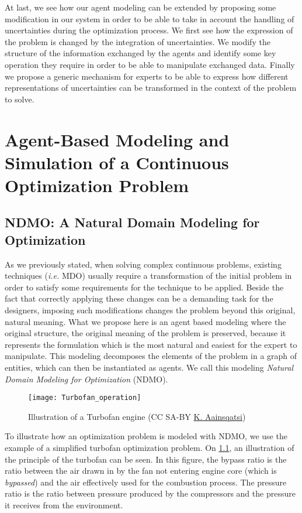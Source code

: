 At last, we see how our agent modeling can be extended by proposing some modification in our system in order to be able to take in account the handling of uncertainties during the optimization process. We first see how the expression of the problem is changed by the integration of uncertainties. We modify the structure of the information exchanged by the agents and identify some key operation they require in order to be able to manipulate exchanged data. Finally we propose a generic mechanism for experts to be able to express how different representations of uncertainties can be transformed in the context of the problem to solve.

\chapter{Agent-Based Modeling and Simulation of a Continuous Optimization Problem}

\section{NDMO: A Natural Domain Modeling for Optimization}\label{modeling}

As we previously stated, when solving complex continuous problems, existing techniques (\emph{i.e.} MDO) usually require a transformation of the initial problem in order to satisfy some requirements for the technique to be applied. Beside the fact that correctly applying these changes can be a demanding task for the designers, imposing such modifications changes the problem beyond this original, natural meaning. What we propose here is an agent based modeling where the original structure, the original meaning of the problem is preserved, because it represents the formulation which is the most natural and easiest for the expert to manipulate. This modeling decomposes the elements of the problem in a graph of entities, which can then be instantiated as agents. We call this modeling \emph{Natural Domain Modeling for Optimization} (NDMO).

\begin{figure}[]
	\centering
	\texttt{[image: Turbofan\_operation]}
	\caption{Illustration of a Turbofan engine (CC SA-BY \href{http://en.wikipedia.org/wiki/File:Turbofan_operation.svg}{K. Aainsqatsi})}
	\label{turbofan_illu}
\end{figure}

To illustrate how an optimization problem is modeled with NDMO, we use the example of a simplified turbofan optimization problem. On \figurename{} \ref{turbofan_illu}, an illustration of the principle of the turbofan can be seen. In this figure, the bypass ratio is the ratio between the air drawn in by the fan not entering engine core (which is \emph{bypassed}) and the air effectively used for the combustion process. The pressure ratio is the ratio between pressure produced by the compressors and the pressure it receives from the environment.

